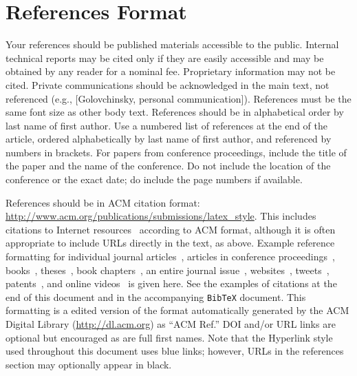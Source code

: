 \documentclass{sigchi}
\begin{document}
\section{References Format}
Your references should be published materials accessible to the
public. Internal technical reports may be cited only if they are
easily accessible and may be obtained by any reader for a nominal
fee. Proprietary information may not be cited. Private communications
should be acknowledged in the main text, not referenced (e.g.,
[Golovchinsky, personal communication]). References must be the same
font size as other body text. References should be in alphabetical
order by last name of first author. Use a numbered list of references
at the end of the article, ordered alphabetically by last name of
first author, and referenced by numbers in brackets. For papers from
conference proceedings, include the title of the paper and the name of
the conference. Do not include the location of the conference or the
exact date; do include the page numbers if available. 

References should be in ACM citation format:
\url{http://www.acm.org/publications/submissions/latex_style}.  This
includes citations to Internet
resources~\cite{CHINOSAUR:venue,cavender:writing,psy:gangnam}
according to ACM format, although it is often appropriate to include
URLs directly in the text, as above. Example reference formatting for
individual journal articles~\cite{ethics}, articles in conference
proceedings~\cite{Klemmer:2002:WSC:503376.503378},
books~\cite{Schwartz:1995:GBF}, theses~\cite{sutherland:sketchpad},
book chapters~\cite{winner:politics}, an entire journal
issue~\cite{kaye:puc},
websites~\cite{acm_categories,cavender:writing},
tweets~\cite{CHINOSAUR:venue}, patents~\cite{heilig:sensorama}, and
online videos~\cite{psy:gangnam} is given here.  See the examples of
citations at the end of this document and in the accompanying
\texttt{BibTeX} document. This formatting is a edited version of the
format automatically generated by the ACM Digital Library
(\url{http://dl.acm.org}) as ``ACM Ref.'' DOI and/or URL links are
optional but encouraged as are full first names. Note that the
Hyperlink style used throughout this document uses blue links;
however, URLs in the references section may optionally appear in
black.

\balance{}



\end{document}
